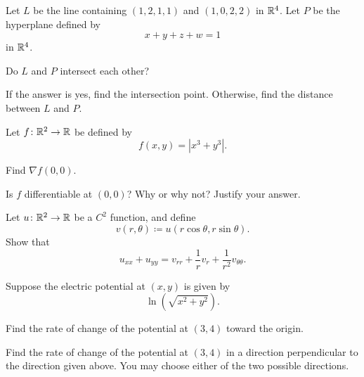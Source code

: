 \begin{problem}
Let $L$ be the line containing $(1,2,1,1)$ and $(1,0,2,2)$ in $\mathbb{R}^4$. Let $P$ be the hyperplane defined by
\[
x+y+z+w=1
\]
in $\mathbb{R}^4$.
\begin{problemsubparts}
\item Do $L$ and $P$ intersect each other?
\item If the answer is yes, find the intersection point. Otherwise, find the distance between $L$ and $P$.
\end{problemsubparts}
\end{problem}

\begin{problem}
Let $f\colon\mathbb{R}^2\to\mathbb{R}$ be defined by
\[
f(x,y)=|x^3+y^3|.
\]
\begin{problemsubparts}
\item Find $\nabla f(0,0)$.
\item Is $f$ differentiable at $(0,0)$? Why or why not? Justify your answer.
\end{problemsubparts}
\end{problem}

\begin{problem}
Let $u\colon\mathbb{R}^2\to\mathbb{R}$ be a $C^2$ function, and define
\[
v(r,\theta)\coloneqq u(r\cos\theta,r\sin\theta).
\]
Show that
\[
u_{xx}+u_{yy}
=
v_{rr}+\frac1r v_r+\frac1{r^2}v_{\theta\theta}.
\]
\end{problem}

\begin{problem}
Suppose the electric potential at $(x,y)$ is given by
\[
\ln\!\left(\sqrt{x^2+y^2}\right).
\]
\begin{problemsubparts}
\item Find the rate of change of the potential at $(3,4)$ toward the origin.
\item Find the rate of change of the potential at $(3,4)$ in a direction perpendicular to the direction given above. You may choose either of the two possible directions.
\end{problemsubparts}
\end{problem}

